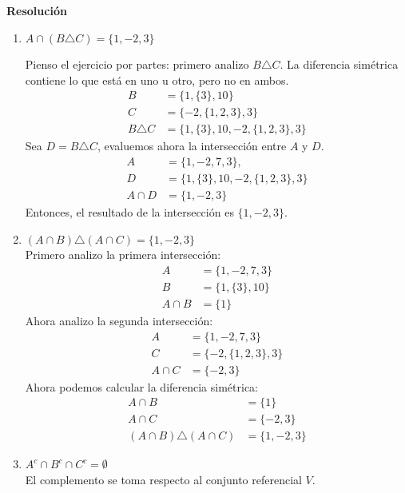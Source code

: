 \documentclass[11pt]{article}
\begin{document}
\textbf{Resolución}
\begin{enumerate}[label=\roman*)]
    \item \(A \cap (B \triangle C) = \{1, -2, 3\}\)
    
    Pienso el ejercicio por partes: primero analizo \(B \triangle C\). La diferencia simétrica contiene lo que está en uno u otro, pero no en ambos.
    \begin{align*}
        B &= \{1,\{3\}, 10 \} \\
        C &= \{-2,\{1,2,3\},3\} \\
        B \triangle C &= \{1, \{3\}, 10, -2, \{1,2,3\}, 3\}
    \end{align*}
    Sea \(D = B \triangle C\), evaluemos ahora la intersección entre \(A\) y \(D\).
    \begin{align*}
        A &= \{1,-2,7,3\}, \\
        D &= \{1, \{3\}, 10, -2, \{1,2,3\}, 3\}\\
        A \cap D &= \{1, -2, 3\}
    \end{align*}
    Entonces, el resultado de la intersección es \(\{1, -2, 3\}\).
    
    \item \((A \cap B) \triangle (A \cap C) =  \{1, -2, 3\} \) \\[6pt]
    Primero analizo la primera intersección:
    \begin{align*}
        A &= \{1,-2,7,3\}\\
        B &= \{1, \{3\}, 10\}\\
        A \cap B &= \{1\}
    \end{align*}
    Ahora analizo la segunda intersección:
    \begin{align*}
        A &= \{1, -2, 7, 3\}\\
        C &= \{-2, \{1,2,3\}, 3\}\\
        A \cap C &= \{-2, 3\}
    \end{align*}
    Ahora podemos calcular la diferencia simétrica:
    \begin{align*}
        A \cap B &= \{1\} \\
        A \cap C &= \{-2, 3\} \\
        (A \cap B) \triangle (A \cap C) &= \{1, -2, 3\}
    \end{align*}
    
    \item \(A^{c} \cap B^{c} \cap C^{c} = \emptyset\) \\[6pt]
    El complemento se toma respecto al conjunto referencial \(V\). 
    

\end{enumerate}
\end{document}
